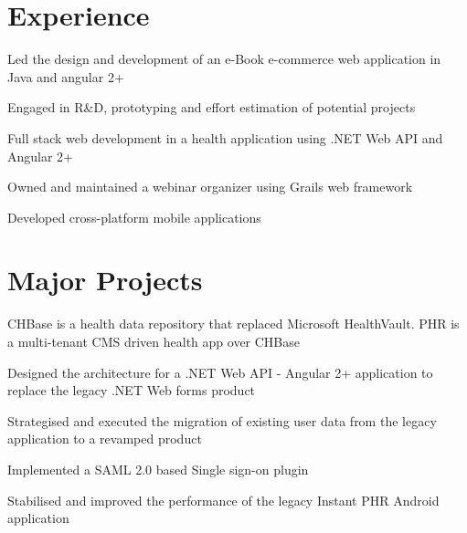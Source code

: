 \documentclass[]{deedy-resume-openfont}
\begin{document}
\begin{minipage}[t]{0.66\textwidth} 


\section{Experience}

\vspace{\topsep} %
\begin{tightemize}
    \item Led the design and development of an e-Book e-commerce web application in Java and angular 2+
    \item Engaged in R\&D, prototyping and effort estimation of potential projects
    \item Full stack web development in a health application using .NET Web API and Angular 2+
    \item Owned and maintained a webinar organizer using Grails web framework 
    \item Developed cross-platform mobile applications
    
\end{tightemize}
\sectionsep


\section{Major Projects}

\begin{tightemize} 
    \item CHBase is a health data repository that replaced Microsoft HealthVault. PHR is a multi-tenant CMS driven health app over CHBase
    \item Designed the architecture for a .NET Web API - Angular 2+ application to replace the legacy .NET Web forms product
    \item Strategised and executed the migration of existing user data from the legacy application to a revamped product
    \item Implemented a SAML 2.0 based Single sign-on plugin
    \item Stabilised and improved the performance of the legacy Instant PHR Android application
\end{tightemize}
\sectionsep


\end{minipage}
\end{document}
